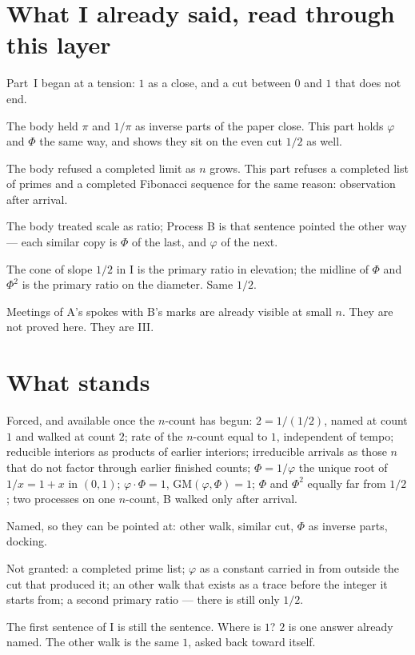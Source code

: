 \documentclass[10pt,a4paper]{article}
\theoremstyle{plain}
\theoremstyle{definition}
\theoremstyle{remark}
\begin{document}
\section{What I already said, read through this layer}

Part~I began at a tension: $1$ as a close, and a cut between $0$ and $1$ that does not end.

The body held $\pi$ and $1/\pi$ as inverse parts of the paper close.
This part holds $\varphi$ and $\Phi$ the same way, and shows they sit on the even cut $1/2$ as well.

The body refused a completed limit as $n$ grows.
This part refuses a completed list of primes and a completed Fibonacci sequence for the same reason: observation after arrival.

The body treated scale as ratio; Process B is that sentence pointed the other way --- each similar copy is $\Phi$ of the last, and $\varphi$ of the next.

The cone of slope $1/2$ in I is the primary ratio in elevation; the midline of $\Phi$ and $\Phi^{2}$ is the primary ratio on the diameter.
Same $1/2$.

Meetings of A's spokes with B's marks are already visible at small $n$.
They are not proved here.
They are III.

\section{What stands}

Forced, and available once the $n$-count has begun:
$2=1/(1/2)$, named at count $1$ and walked at count $2$;
rate of the $n$-count equal to $1$, independent of tempo;
reducible interiors as products of earlier interiors;
irreducible arrivals as those $n$ that do not factor through earlier finished counts;
$\Phi=1/\varphi$ the unique root of $1/x=1+x$ in $(0,1)$;
$\varphi\cdot\Phi=1$, $\mathrm{GM}(\varphi,\Phi)=1$;
$\Phi$ and $\Phi^{2}$ equally far from $1/2$;
two processes on one $n$-count, B walked only after arrival.

Named, so they can be pointed at:
other walk, similar cut, $\Phi$ as inverse parts, docking.

Not granted:
a completed prime list;
$\varphi$ as a constant carried in from outside the cut that produced it;
an other walk that exists as a trace before the integer it starts from;
a second primary ratio --- there is still only $1/2$.

The first sentence of I is still the sentence.
Where is $1$?
$2$ is one answer already named.
The other walk is the same $1$, asked back toward itself.
\end{document}
